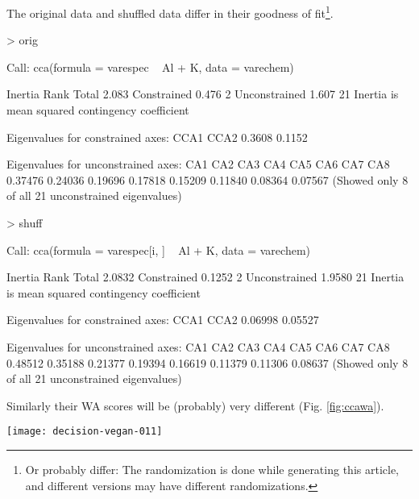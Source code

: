 \documentclass[a4paper,10pt]{amsart}
\begin{document}
The original data and shuffled data differ in their goodness of
fit\footnote{Or probably differ: The randomization is done while
generating this article, and different versions may have different
randomizations.}.
\begin{Schunk}
\begin{Sinput}
> orig
\end{Sinput}
\begin{Soutput}
Call:
cca(formula = varespec ~ Al + K, data = varechem) 

              Inertia Rank
Total           2.083     
Constrained     0.476    2
Unconstrained   1.607   21
Inertia is mean squared contingency coefficient 

Eigenvalues for constrained axes:
  CCA1   CCA2 
0.3608 0.1152 

Eigenvalues for unconstrained axes:
    CA1     CA2     CA3     CA4     CA5     CA6     CA7     CA8 
0.37476 0.24036 0.19696 0.17818 0.15209 0.11840 0.08364 0.07567 
(Showed only 8 of all 21 unconstrained eigenvalues)
\end{Soutput}
\begin{Sinput}
> shuff
\end{Sinput}
\begin{Soutput}
Call:
cca(formula = varespec[i, ] ~ Al + K, data = varechem) 

              Inertia Rank
Total          2.0832     
Constrained    0.1252    2
Unconstrained  1.9580   21
Inertia is mean squared contingency coefficient 

Eigenvalues for constrained axes:
   CCA1    CCA2 
0.06998 0.05527 

Eigenvalues for unconstrained axes:
    CA1     CA2     CA3     CA4     CA5     CA6     CA7     CA8 
0.48512 0.35188 0.21377 0.19394 0.16619 0.11379 0.11306 0.08637 
(Showed only 8 of all 21 unconstrained eigenvalues)
\end{Soutput}
\end{Schunk}
Similarly their WA scores will be (probably) very different
(Fig. \ref{fig:ccawa}).
\begin{SCfigure}
\texttt{[image: decision-vegan-011]}
\caption{Procrustes rotation of WA scores of CCA with the original and
  shuffled data.}
\label{fig:ccawa}
\end{SCfigure}
\end{document}
